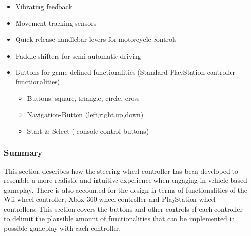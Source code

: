 \begin{itemize}
\item Vibrating feedback
\item Movement tracking sensors
\item Quick release handlebar levers for motorcycle controls
\item Paddle shifters for semi-automatic driving
\item Buttons for game-defined functionalities (Standard PlayStation controller functionalities)
	\begin{itemize}
	\item Buttons: square, triangle, circle, cross
	\item Navigation-Button (left,right,up,down)
	\item Start \& Select ( console control buttons)
	\end{itemize}
\end{itemize}

\subsubsection*{Summary}
This section describes how the steering wheel controller has been developed to resemble a more realistic and intuitive experience when engaging in vehicle based gameplay. There is also accounted for the design in terms of functionalities of the Wii wheel controller, Xbox 360 wheel controller and PlayStation wheel controllers. This section covers the buttons and other controls of each controller to delimit the plausible amount of functionalities that can be implemented in possible gameplay with each controller.
